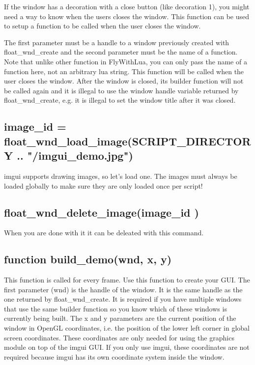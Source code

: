 \documentclass[11pt,parskip=half,a4paper]{scrartcl}
\begin{document}
If the window has a decoration with a close button (like decoration 1), you might need a way to know when the users closes the window. This function can be used to setup a function to be called when the user closes the window.

The first parameter must be a handle to a window previously created with float\_wnd\_create and the second parameter must be the name of a function. Note that unlike other function in FlyWithLua, you
can only pass the name of a function here, not an arbitrary lua string. This function will be called
when the user closes the window. After the window is closed, its builder function will not be called
again and it is illegal to use the window handle variable returned by float\_wnd\_create, e.g. it is illegal
to set the window title after it was closed.

\newpage

\subsection{image\_id = float\_wnd\_load\_image(SCRIPT\_DIRECTORY .. "/imgui\_demo.jpg")}

imgui supports drawing images, so let's load one. The images must always be loaded globally to make sure they are only loaded once per script!

\subsection{float\_wnd\_delete\_image(image\_id )}

When you are done with it it can be deleated with this command.

\subsection{function build\_demo(wnd, x, y)}

This function is called for every frame. Use this function to create your GUI. The first parameter (wnd)
is the handle of the window. It is the same handle as the one returned by float\_wnd\_create. It is required if you have multiple windows that use the same builder function so you know which of these windows is currently being built. The x and y parameters are the current position of the window in OpenGL coordinates, i.e. the position of the lower left corner in global screen coordinates. These coordinates are only needed for using the graphics module on top of the imgui GUI. If you only use imgui, these coordinates are not required because imgui has its own coordinate system inside the window.
\end{document}
